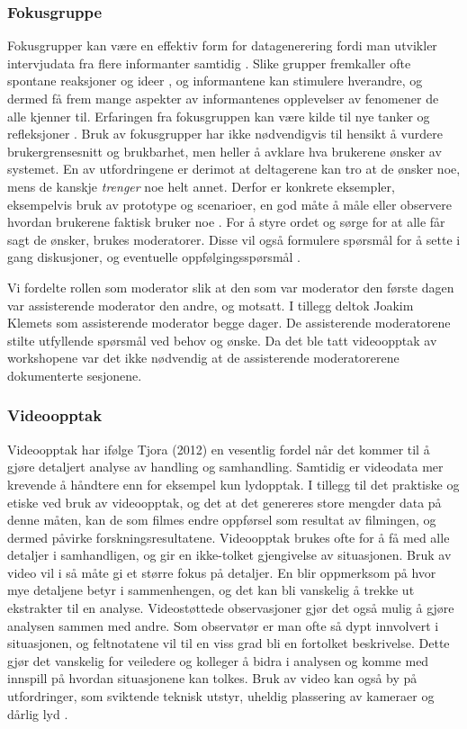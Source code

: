 \subsubsection{Fokusgruppe}
Fokusgrupper kan være en effektiv form for datagenerering fordi man utvikler intervjudata fra flere informanter samtidig \cite{Tjora}. Slike grupper fremkaller ofte spontane reaksjoner og ideer \cite{Nielsen97}, og informantene kan stimulere hverandre, og dermed få frem mange aspekter av informantenes opplevelser av fenomener de alle kjenner til. Erfaringen fra fokusgruppen kan være kilde til nye tanker og refleksjoner \cite{Tjora}. Bruk av fokusgrupper har ikke nødvendigvis til hensikt å vurdere brukergrensesnitt og brukbarhet, men heller å avklare hva brukerene ønsker av systemet. En av utfordringene er derimot at deltagerene kan tro at de ønsker noe, mens de kanskje \emph{trenger} noe helt annet. Derfor er konkrete eksempler, eksempelvis bruk av prototype og scenarioer, en god måte å måle eller observere hvordan brukerene faktisk bruker noe \cite{Nielsen97}.
For å styre ordet og sørge for at alle får sagt de ønsker, brukes moderatorer. Disse vil også formulere spørsmål for å sette i gang diskusjoner, og eventuelle oppfølgingsspørsmål \cite{Tjora}. 

\noindent
Vi fordelte rollen som moderator slik at den som var moderator den første dagen var assisterende moderator den andre, og motsatt. I tillegg deltok Joakim Klemets som assisterende moderator begge dager. De assisterende moderatorene stilte utfyllende spørsmål ved behov og ønske. Da det ble tatt videoopptak av workshopene var det ikke nødvendig at de assisterende moderatorerene dokumenterte sesjonene. 

\subsubsection{Videoopptak}
Videoopptak har ifølge Tjora (2012) en vesentlig fordel når det kommer til å gjøre detaljert analyse av handling og samhandling. Samtidig er videodata mer krevende å håndtere enn for eksempel kun lydopptak. I tillegg til det praktiske og etiske ved bruk av videoopptak, og det at det genereres store mengder data på denne måten, kan de som filmes endre oppførsel som resultat av filmingen, og dermed påvirke forskningsresultatene. Videoopptak brukes ofte for å få med alle detaljer i samhandligen, og gir en ikke-tolket gjengivelse av situasjonen. Bruk av video vil i så måte gi et større fokus på detaljer. En blir oppmerksom på hvor mye detaljene betyr i sammenhengen, og det kan bli vanskelig å trekke ut ekstrakter til en analyse. 
Videostøttede observasjoner gjør det også mulig å gjøre analysen sammen med andre. Som observatør er man ofte så dypt innvolvert i situasjonen, og feltnotatene vil til en viss grad bli en fortolket beskrivelse. Dette gjør det vanskelig for veiledere og kolleger å bidra i analysen og komme med innspill på hvordan situasjonene kan tolkes. 
Bruk av video kan også by på utfordringer, som sviktende teknisk utstyr, uheldig plassering av kameraer og dårlig lyd \cite{Tjora}.

